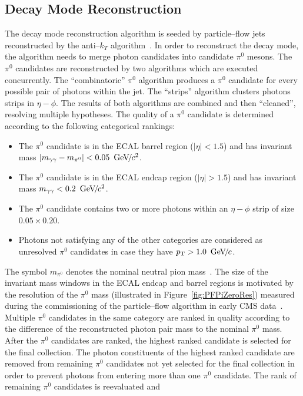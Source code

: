 \subsection{Decay Mode Reconstruction}
%
The decay mode reconstruction algorithm is seeded by particle--flow jets
reconstructed by the anti--$k_{T}$ algorithm~\cite{AntiKT}.  In order to
reconstruct the decay mode, the algorithm needs to merge photon candidates into
candidate $\pi^0$ mesons.  The $\pi^0$ candidates are reconstructed by two
algorithms which are executed concurrently.  The ``combinatoric'' $\pi^0$
algorithm produces a $\pi^0$ candidate for every possible pair of photons within
the jet.  The ``strips'' algorithm clusters photons strips in $\eta-\phi$.  The
results of both algorithms are combined and then ``cleaned'', resolving multiple
hypotheses.  The quality of a $\pi^0$ candidate is determined according to the
following categorical rankings:
\begin{itemize}
\item The $\pi^0$ candidate is in the ECAL barrel region ($|\eta| < 1.5$) 
and has invariant mass $|m_{\gamma \gamma} - m_{\pi^0}| < 0.05~{\,\text{Ge\hspace{-.08em}V\hspace{-0.16em}/\hspace{-0.08em}}c^\text{2}}$.
\item The $\pi^0$ candidate is in the ECAL endcap region ($|\eta| > 1.5$)
 and has invariant mass $m_{\gamma \gamma} < 0.2~{\,\text{Ge\hspace{-.08em}V\hspace{-0.16em}/\hspace{-0.08em}}c^\text{2}}$.
\item The $\pi^0$ candidate contains two or more photons within an $\eta-\phi$ strip of size $0.05 \times 0.20$.
\item Photons not satisfying any of the other categories are considered as
  unresolved $\pi^0$ candidates in case they have $p_{\mathrm{T}} > 1.0~{\,\text{Ge\hspace{-.08em}V\hspace{-0.16em}/\hspace{-0.08em}}c}$.
\end{itemize}  
The symbol $m_{\pi^0}$ denotes the nominal neutral pion mass~\cite{PDG}.  The
size of the invariant mass windows in the ECAL endcap and barrel regions is
motivated by the resolution of the $\pi^0$ mass (illustrated in
Figure~\ref{fig:PFPiZeroRes}) measured during the commissioning of the
particle--flow algorithm in early CMS data~\cite{CMS-PAS-PFT-10-002}.  Multiple
$\pi^0$ candidates in the same category are ranked in quality according to the
difference of the reconstructed photon pair mass to the nominal $\pi^0$ mass.
After the $\pi^0$ candidates are ranked, the highest ranked candidate is
selected for the final collection.  The photon constituents of the highest
ranked candidate are removed from remaining $\pi^0$ candidates not yet selected
for the final collection in order to prevent photons from entering more than one
$\pi^0$ candidate.  The rank of remaining $\pi^0$ candidates is reevaluated and
